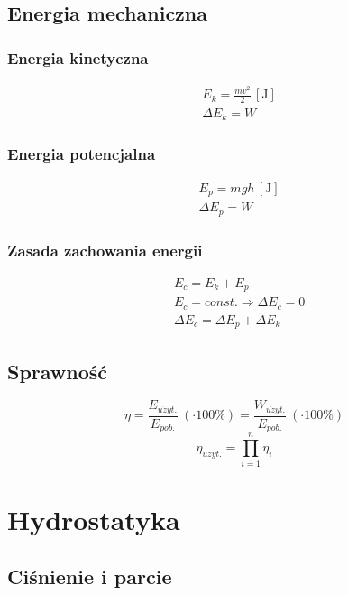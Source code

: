 \documentclass{report}
\numberwithin{equation}{chapter}
\newcommand{\unit}[1]{\,\left[\mathrm{#1}\right]}
\begin{document}
    \section{Energia mechaniczna}
      \subsection{Energia kinetyczna}
        \begin{align}
          &E_k = \frac{mv^2}{2} \unit{J}\\
          &\Delta E_k = W
        \end{align}
      \subsection{Energia potencjalna}
        \begin{align}
          &E_p = mgh \unit{J}\\
          &\Delta E_p = W
        \end{align}
      \subsection{Zasada zachowania energii}
        \begin{align}
          &E_c = E_k + E_p\\
          &E_c = const. \Rightarrow \Delta E_c = 0\\
          &\Delta E_c = \Delta E_p + \Delta E_k
        \end{align}
    \section{Sprawność}
      \begin{equation}
        \eta = \frac{E_{u\dot{z}yt.}}{E_{pob.}}\: (\cdot 100\%) = \frac{W_{u\dot{z}yt.}}{E_{pob.}}\: (\cdot 100\%)
      \end{equation}
      \begin{equation}
        \eta_{u\dot{z}yt.} = \prod_{i=1}^n \eta_i
      \end{equation}

  \newpage
  \chapter{Hydrostatyka}
    \section{Ciśnienie i parcie}
\end{document}
